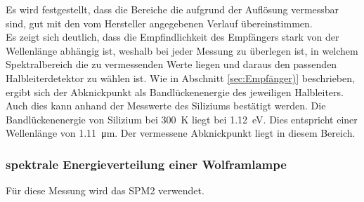 \documentclass[a4paper,twoside,final]{article}
\begin{document}
%

\FloatBarrier

Es wird festgestellt, dass die Bereiche die aufgrund der Auflösung vermessbar sind, gut mit den vom Hersteller angegebenen Verlauf übereinstimmen. \\
Es zeigt sich deutlich, dass die Empfindlichkeit des Empfängers stark von der Wellenlänge abhängig ist, weshalb bei jeder Messung zu überlegen ist, in welchem Spektralbereich die zu vermessenden Werte liegen und daraus den passenden Halbleiterdetektor zu wählen ist. Wie in Abschnitt \ref{sec:Empfänger)} beschrieben, ergibt sich der Abknickpunkt als Bandlückenenergie des jeweiligen Halbleiters. Auch dies kann anhand der Messwerte des Siliziums bestätigt werden. Die Bandlückenenergie von Silizium bei \SI{300}{\kelvin} liegt bei \SI{1.12}{\electronvolt}. Dies entspricht einer Wellenlänge von \SI{1.11}{\micro\meter}. Der vermessene Abknickpunkt liegt in diesem Bereich.

\subsubsection{spektrale Energieverteilung einer Wolframlampe}
Für diese Messung wird das SPM2 verwendet.
\end{document}
